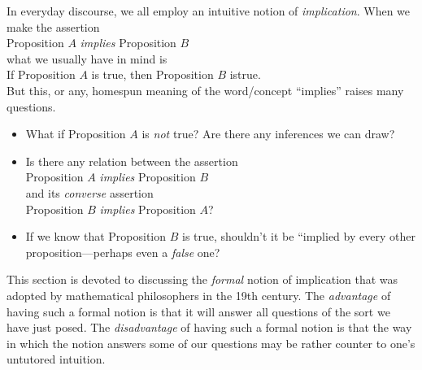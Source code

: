 In everyday discourse, we all employ an intuitive notion of {\it implication}.
When we make the assertion \\
\hspace*{.35in}Proposition $A$ {\it implies} Proposition $B$ \\
what we usually have in mind is \\
\hspace*{.35in}If Proposition $A$ is true, then Proposition $B$ istrue. \\
But this, or any, homespun meaning of the word/concept ``implies''
raises many questions.
\begin{itemize}
\item
What if Proposition $A$ is {\em not} true?  Are there any inferences
we can draw?

\item
Is there any relation between the assertion \\
\hspace*{.35in}Proposition $A$ {\it implies} Proposition $B$ \\
and its {\it converse}
assertion \\
\hspace*{.35in}Proposition $B$ {\it implies} Proposition $A$?

\item
If we know that Proposition $B$ is true, shouldn't it be ``implied by
every other proposition---perhaps even a {\em false} one?
\end{itemize}
This section is devoted to discussing the {\em formal} notion of
implication
%
that was adopted by mathematical philosophers in the 19th century.
The {\em advantage} of having such a formal notion is that it will
answer all questions of the sort we have just posed.  The {\em
  disadvantage} of having such a formal notion is that the way in
which the notion answers some of our questions may be rather counter
to one's untutored intuition.
